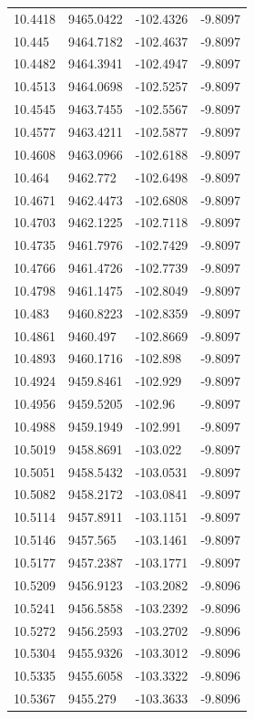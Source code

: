 \begin{table}[H]
\begin{tabular}{llll}
10.4418 & 9465.0422 & -102.4326 & -9.8097 \\
10.445 & 9464.7182 & -102.4637 & -9.8097 \\
10.4482 & 9464.3941 & -102.4947 & -9.8097 \\
10.4513 & 9464.0698 & -102.5257 & -9.8097 \\
10.4545 & 9463.7455 & -102.5567 & -9.8097 \\
10.4577 & 9463.4211 & -102.5877 & -9.8097 \\
10.4608 & 9463.0966 & -102.6188 & -9.8097 \\
10.464 & 9462.772 & -102.6498 & -9.8097 \\
10.4671 & 9462.4473 & -102.6808 & -9.8097 \\
10.4703 & 9462.1225 & -102.7118 & -9.8097 \\
10.4735 & 9461.7976 & -102.7429 & -9.8097 \\
10.4766 & 9461.4726 & -102.7739 & -9.8097 \\
10.4798 & 9461.1475 & -102.8049 & -9.8097 \\
10.483 & 9460.8223 & -102.8359 & -9.8097 \\
10.4861 & 9460.497 & -102.8669 & -9.8097 \\
10.4893 & 9460.1716 & -102.898 & -9.8097 \\
10.4924 & 9459.8461 & -102.929 & -9.8097 \\
10.4956 & 9459.5205 & -102.96 & -9.8097 \\
10.4988 & 9459.1949 & -102.991 & -9.8097 \\
10.5019 & 9458.8691 & -103.022 & -9.8097 \\
10.5051 & 9458.5432 & -103.0531 & -9.8097 \\
10.5082 & 9458.2172 & -103.0841 & -9.8097 \\
10.5114 & 9457.8911 & -103.1151 & -9.8097 \\
10.5146 & 9457.565 & -103.1461 & -9.8097 \\
10.5177 & 9457.2387 & -103.1771 & -9.8097 \\
10.5209 & 9456.9123 & -103.2082 & -9.8096 \\
10.5241 & 9456.5858 & -103.2392 & -9.8096 \\
10.5272 & 9456.2593 & -103.2702 & -9.8096 \\
10.5304 & 9455.9326 & -103.3012 & -9.8096 \\
10.5335 & 9455.6058 & -103.3322 & -9.8096 \\
10.5367 & 9455.279 & -103.3633 & -9.8096 \\

\end{tabular}
\end{table}
